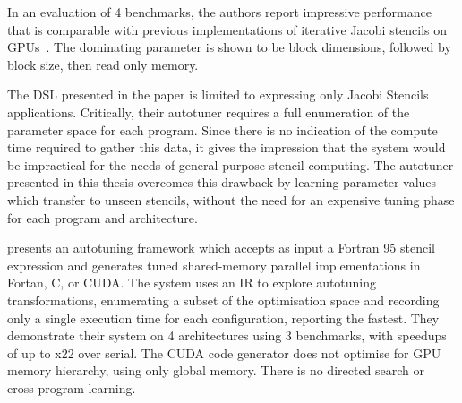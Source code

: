 In an evaluation of 4 benchmarks, the authors report impressive
performance that is comparable with previous implementations of
iterative Jacobi stencils on
GPUs~\cite{Holewinski2012,Phillips2010}. The dominating parameter is
shown to be block dimensions, followed by block size, then read only
memory.

%

The DSL presented in the paper is limited to expressing only Jacobi
Stencils applications. Critically, their autotuner requires a full
enumeration of the parameter space for each program. Since there is no
indication of the compute time required to gather this data, it gives
the impression that the system would be impractical for the needs of
general purpose stencil computing. The autotuner presented in this
thesis overcomes this drawback by learning parameter values which
transfer to unseen stencils, without the need for an expensive tuning
phase for each program and architecture.



\citeauthor{Kamil2010} presents an autotuning framework which accepts
as input a Fortran 95 stencil expression and generates tuned
shared-memory parallel implementations in Fortan, C, or CUDA. The
system uses an IR to explore autotuning transformations, enumerating a
subset of the optimisation space and recording only a single execution
time for each configuration, reporting the fastest. They demonstrate
their system on 4 architectures using 3 benchmarks, with speedups of
up to x22 over serial. The CUDA code generator does not optimise for
GPU memory hierarchy, using only global memory. There is no directed
search or cross-program learning.

